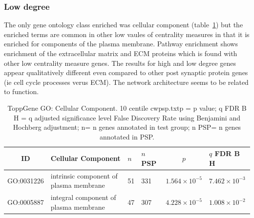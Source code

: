 


\subsubsection{Low degree}
The only gene ontology class enriched was cellular component (table~\ref{tab:ToppGENE GO: Cellular Component. 10 centile cwpsp.txtp = p value; q FDR B H = q adjusted significance level False Discovery Rate using Benjamini and Hochberg adjustment; n= n genes annotated in test group; n PSP= n genes annotated in PSP}) but the enriched terms are common in other low vaules of centrality measures in that it is enriched for components of the plasma membrane. Pathway enrichment shows enrichment of the extracellular matrix and ECM proteins which is found with other low centrality measure genes. The results for high and low degree genes appear qualitatively different even compared to other post synaptic protein genes (ie cell cycle processes verus ECM). The network architecture seems to be related to function.



\begin{table}[ht]
\centering

\begin{adjustbox}{width=\textwidth}
\setlength{\extrarowheight}{2pt}
\begin{tabular}{@{}clllcl@{}}
  \toprule
  ID & Cellular Component & $n$ & $n$ PSP &$p$ & $q$ FDR B H   \\ 
  \midrule
GO:0031226 & intrinsic component of plasma membrane & 51 & 331 & $1.564 \times 10^{-5}$ & $7.462 \times 10^{-3}$ \\ 
  GO:0005887 & integral component of plasma membrane  & 47 & 307& $4.228 \times 10^{-5}$ & $1.008 \times 10^{-2}$ \\ 
   \bottomrule
\end{tabular}
\end{adjustbox}
\caption{ToppGene GO: Cellular Component. 10 centile cwpsp.txtp = p value; q FDR B H = q adjusted significance level False Discovery Rate using Benjamini and Hochberg adjustment; n= n genes annotated in test group; n PSP= n genes annotated in PSP. } 
\label{tab:ToppGENE GO: Cellular Component. 10 centile cwpsp.txtp = p value; q FDR B H = q adjusted significance level False Discovery Rate using Benjamini and Hochberg adjustment; n= n genes annotated in test group; n PSP= n genes annotated in PSP}
\end{table}


